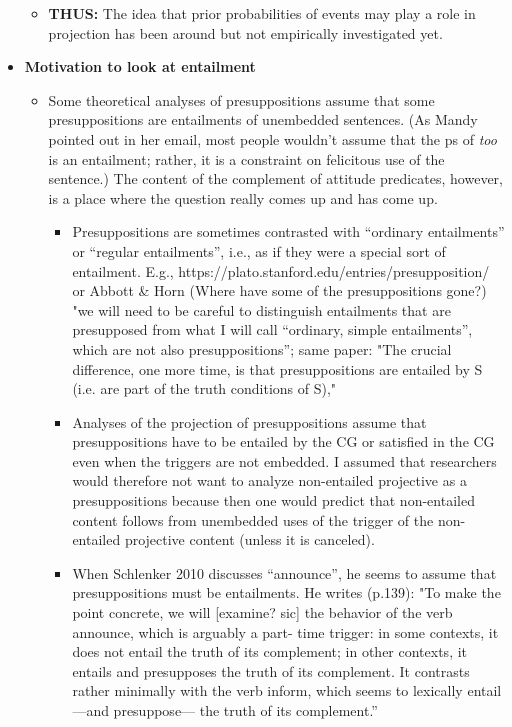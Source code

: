 \documentclass[11pt,fleqn]{article}
\newcommand{\6}{\mbox{$[\hspace*{-.6mm}[$}}
\newcommand{\9}{\mbox{$]\hspace*{-.6mm}]$}}
\begin{document}
\begin{itemize}
\begin{itemize}
\item {\bf THUS:} The idea that prior probabilities of events may play a role in projection has been around but not empirically investigated yet.

\end{itemize}

\item {\bf Motivation to look at entailment}

\begin{itemize}

\item Some theoretical analyses of presuppositions assume that some presuppositions are entailments of unembedded sentences. (As Mandy pointed out in her email, most people wouldn't assume that the ps of {\em too} is an entailment; rather, it is a constraint on felicitous use of the sentence.) The content of the complement of attitude predicates, however, is a place where the question really comes up and has come up.

\begin{itemize}

\item Presuppositions are sometimes contrasted with “ordinary entailments” or “regular entailments”, i.e., as if they were a special sort of entailment. E.g., https://plato.stanford.edu/entries/presupposition/ or Abbott \& Horn (Where have some of the presuppositions gone?) "we will need to be careful to distinguish entailments that are presupposed from what I will call “ordinary, simple entailments”, which are not also presuppositions”; same paper: "The crucial difference, one more time, is that presuppositions are entailed by S (i.e. are part of the truth conditions of S),"

\item Analyses of the projection of presuppositions assume that presuppositions have to be entailed by the CG or satisfied in the CG even when the triggers are not embedded. I assumed that researchers would therefore not want to analyze non-entailed projective as a presuppositions because then one would predict that non-entailed content follows from unembedded uses of the trigger of the non-entailed projective content (unless it is canceled).

\item When Schlenker 2010 discusses “announce”, he seems to assume that presuppositions must be entailments. He writes (p.139): "To make the point concrete, we will [examine? sic] the behavior of the verb announce, which is arguably a part- time trigger: in some contexts, it does not entail the truth of its complement; in other contexts, it entails and presupposes the truth of its complement. It contrasts rather minimally with the verb inform, which seems to lexically entail—and presuppose— the truth of its complement.” 


\end{itemize}
\end{itemize}
\end{itemize}
\end{document}
